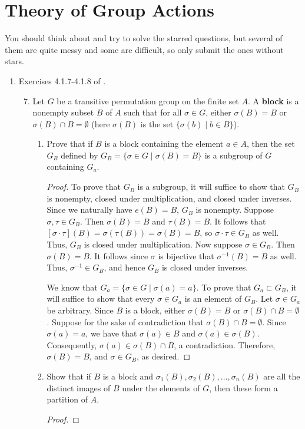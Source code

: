\documentclass[../psets.tex]{subfiles}
\begin{document}
\section{Theory of Group Actions}
You should think about and try to solve the starred questions, but several of them are quite messy and some are difficult, so only submit the ones without stars.
\begin{enumerate}
    \item Exercises 4.1.7-4.1.8 of \textcite{bib:DummitFoote}.
    \begin{enumerate}[label={\textbf{\arabic*.}}]
        \setcounter{enumii}{6}
        \item Let $G$ be a transitive permutation group on the finite set $A$. A \textbf{block} is a nonempty subset $B$ of $A$ such that for all $\sigma\in G$, either $\sigma(B)=B$ or $\sigma(B)\cap B=\emptyset$ (here $\sigma(B)$ is the set $\{\sigma(b)\mid b\in B\}$).
        \begin{enumerate}[label={\textbf{(\alph*)}}]
            \item Prove that if $B$ is a block containing the element $a\in A$, then the set $G_B$ defined by $G_B=\{\sigma\in G\mid\sigma(B)=B\}$ is a subgroup of $G$ containing $G_a$.
            \begin{proof}
                To prove that $G_B$ is a subgroup, it will suffice to show that $G_B$ is nonempty, closed under multiplication, and closed under inverses. Since we naturally have $e(B)=B$, $G_B$ is nonempty. Suppose $\sigma,\tau\in G_B$. Then $\sigma(B)=B$ and $\tau(B)=B$. It follows that $[\sigma\cdot\tau](B)=\sigma(\tau(B))=\sigma(B)=B$, so $\sigma\cdot\tau\in G_B$ as well. Thus, $G_B$ is closed under multiplication. Now suppose $\sigma\in G_B$. Then $\sigma(B)=B$. It follows since $\sigma$ is bijective that $\sigma^{-1}(B)=B$ as well. Thus, $\sigma^{-1}\in G_B$, and hence $G_B$ is closed under inverses.\par
                We know that $G_a=\{\sigma\in G\mid\sigma(a)=a\}$. To prove that $G_a\subset G_B$, it will suffice to show that every $\sigma\in G_a$ is an element of $G_B$. Let $\sigma\in G_a$ be arbitrary. Since $B$ is a block, either $\sigma(B)=B$ or $\sigma(B)\cap B=\emptyset$. Suppose for the sake of contradiction that $\sigma(B)\cap B=\emptyset$. Since $\sigma(a)=a$, we have that $\sigma(a)\in B$ and $\sigma(a)\in\sigma(B)$. Consequently, $\sigma(a)\in\sigma(B)\cap B$, a contradiction. Therefore, $\sigma(B)=B$, and $\sigma\in G_B$, as desired.
            \end{proof}
            \item Show that if $B$ is a block and $\sigma_1(B),\sigma_2(B),\dots,\sigma_n(B)$ are all the distinct images of $B$ under the elements of $G$, then these form a partition of $A$.
            \begin{proof}


\end{proof}
\end{enumerate}
\end{enumerate}
\end{enumerate}
\end{document}
